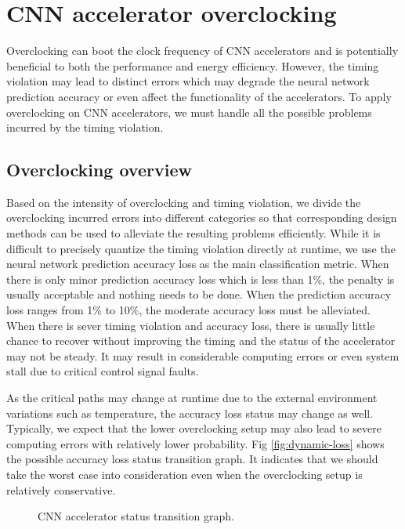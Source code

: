 \section{CNN accelerator overclocking} \label{sec:framework}
Overclocking can boot the clock frequency of CNN accelerators and is potentially beneficial to both 
the performance and energy efficiency. However, the timing violation may lead to distinct errors which 
may degrade the neural network prediction accuracy or even affect the functionality of the accelerators. 
To apply overclocking on CNN accelerators, we must handle all the possible 
problems incurred by the timing violation. 

\subsection{Overclocking overview}
Based on the intensity of overclocking and timing 
violation, we divide the overclocking incurred errors into different 
categories so that corresponding design methods can be used to 
alleviate the resulting problems efficiently. While it is difficult 
to precisely quantize the timing violation directly at runtime, we use 
the neural network prediction accuracy loss as the main 
classification metric. When there is only minor prediction accuracy 
loss which is less than 1\%, the penalty is usually acceptable 
and nothing needs to be done. When the prediction accuracy loss 
ranges from 1\% to 10\%, the moderate accuracy loss must be 
alleviated. When there is sever timing violation and 
accuracy loss, there is usually little chance to recover 
without improving the timing and the status of the accelerator 
may not be steady. It may result in considerable computing errors 
or even system stall due to critical control signal faults.  

As the critical paths may change at runtime due to the external 
environment variations such as temperature, the accuracy loss status may 
change as well. Typically, we expect that the lower overclocking setup 
may also lead to severe computing errors with relatively lower probability.
Fig \ref{fig:dynamic-loss} shows the possible accuracy loss status 
transition graph. It indicates that we should take the worst case 
into consideration even when the overclocking setup is relatively conservative.
\begin{figure}
    \caption{CNN accelerator status transition graph.}
\label{fig:loss-estimation}
\vspace{-1em}
\end{figure}

